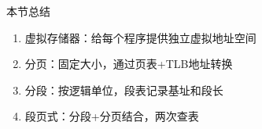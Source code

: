 \documentclass[10pt, aspectratio=169]{beamer}
\begin{document}
\begin{frame}{本节总结}
    \begin{enumerate}
        \item 虚拟存储器：给每个程序提供独立虚拟地址空间
        \item 分页：固定大小，通过页表+TLB地址转换
        \item 分段：按逻辑单位，段表记录基址和段长
        \item 段页式：分段+分页结合，两次查表
    \end{enumerate}
\end{frame}
\end{document}
